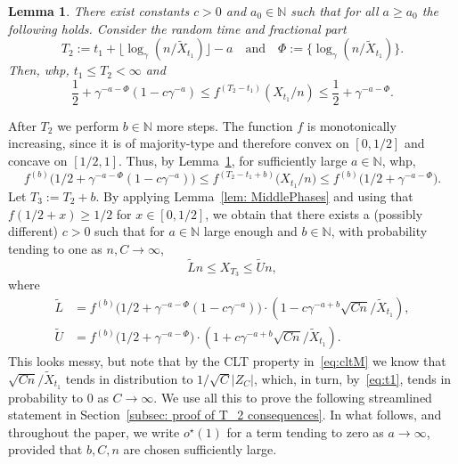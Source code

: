 \documentclass[11pt]{article}
\numberwithin{theorem}{section}
\newtheorem{lemma}[theorem]{Lemma}
\begin{document}
\begin{lemma}\label{lem: T_2} 
There exist constants $c >0$ and $a_0\in\mathbb{N}$ such that for all $a\geq a_0$ the following holds. Consider the random time and fractional part
\begin{equation}
\label{eq:t2}    
    T_2  := t_1 + \lfloor\log_\gamma(n/\tilde X_{t_1})\rfloor-a
    \quad
    \text{and}
    \quad
    \Phi :=  \{\log_\gamma(n/\tilde X_{t_1})\}.
\end{equation}
Then, whp, $t_1 \le T_2 < \infty$ %
and
\begin{equation}\label{eq:t2-2}
    \frac12 + \gamma^{-a-\Phi} (1-c\gamma^{-a}) \leq f^{(T_2-t_1)}(X_{t_1}/n) \leq \frac12 + \gamma^{-a-\Phi}.
\end{equation}
\end{lemma}
After $T_2$ we perform $b \in \mathbb{N}$ more steps.
The function $f$ is monotonically increasing, since it is of majority-type and therefore convex on $[0,1/2]$ and concave on $[1/2,1]$.
Thus, by Lemma~\ref{lem: T_2}, for sufficiently large $a\in\mathbb{N}$, whp,
\[
    f^{(b)}\big(1/2+\gamma^{-a-\Phi}(1-c\gamma^{-a})\big)
    \leq f^{(T_2-t_1+b)}\big(X_{t_1}/n\big)
    \leq f^{(b)}\big(1/2+\gamma^{-a-\Phi}\big).
\]
Let
$T_3 := T_2 + b$. 
By applying Lemma~\ref{lem: MiddlePhases} and using that $f(1/2+x)\geq 1/2$ for $x\in[0,1/2]$, we obtain that there exists a (possibly different) $c>0$ such that for $a\in \mathbb{N}$ large enough and $b\in \mathbb{N}$, with probability tending to one as $n,C\to \infty$,
\[
    \tilde L n\leq X_{T_3} \leq \tilde Un,
\]
where
\begin{equation*}
\begin{aligned}
    \tilde L &= f^{(b)}\big(1/2+\gamma^{-a-\Phi}(1-c\gamma^{-a})\big) \cdot (1-c\gamma^{-a+b}\sqrt{Cn}/\tilde X_{t_1}), \\
    \tilde U &= f^{(b)}\big(1/2+\gamma^{-a-\Phi}\big)\cdot(1+c\gamma^{-a+b}\sqrt{Cn}/\tilde X_{t_1}).
\end{aligned}
\end{equation*}
This looks messy, but note that by the CLT property in~\eqref{eq:cltM} we know that $\sqrt{Cn}/\tilde X_{t_1}$ tends in distribution to $1/\sqrt{C}|Z_C|$, which, in turn, by~\eqref{eq:t1}, tends in probability to $0$ as $C\to \infty$.
We use all this to prove the following streamlined statement in Section~\ref{subsec: proof of T_2 consequences}.
In what follows, and throughout the paper, we write $o^\star(1)$ for a term tending to zero as $a\to\infty$, provided that $b,C,n$ are chosen sufficiently large.
\end{document}
